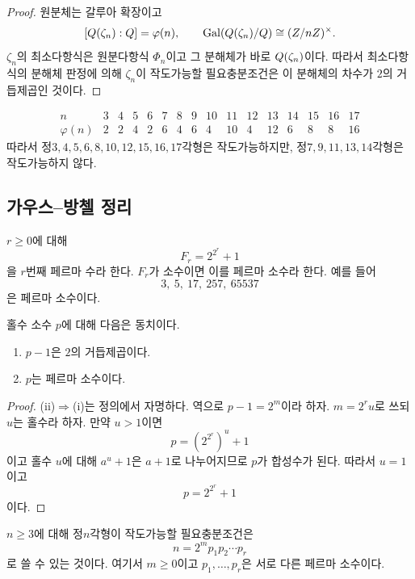 \begin{proof}
원분체는 갈루아 확장이고
\[
  [Q(\zeta_n):Q]=\varphi(n),
  \qquad
  \operatorname{Gal}(Q(\zeta_n)/Q)\cong(Z/nZ)^\times.
\]
$\zeta_n$의 최소다항식은 원분다항식 $\Phi_n$이고 그 분해체가 바로 $Q(\zeta_n)$이다. 따라서 최소다항식의 분해체 판정에 의해 $\zeta_n$이 작도가능할 필요충분조건은 이 분해체의 차수가 $2$의 거듭제곱인 것이다.
\end{proof}

\begin{example}
\[
\begin{array}{c|rrrrrrrrrrrrrrr}
 n&3&4&5&6&7&8&9&10&11&12&13&14&15&16&17\\
\hline
 \varphi(n)&2&2&4&2&6&4&6&4&10&4&12&6&8&8&16
\end{array}
\]
따라서 정$3,4,5,6,8,10,12,15,16,17$각형은 작도가능하지만, 정$7,9,11,13,14$각형은 작도가능하지 않다.
\end{example}

\subsection{가우스--방첼 정리}

\begin{definition}
$r\ge0$에 대해
\[
  F_r=2^{2^r}+1
\]
을 $r$번째 페르마 수라 한다. $F_r$가 소수이면 이를 페르마 소수라 한다. 예를 들어
\[
  3,\ 5,\ 17,\ 257,\ 65537
\]
은 페르마 소수이다.
\end{definition}

\begin{lemma}
홀수 소수 $p$에 대해 다음은 동치이다.
\begin{enumerate}[label=(\roman*)]
  \item $p-1$은 $2$의 거듭제곱이다.
  \item $p$는 페르마 소수이다.
\end{enumerate}
\end{lemma}

\begin{proof}
(ii)$\Rightarrow$(i)는 정의에서 자명하다. 역으로 $p-1=2^m$이라 하자. $m=2^r u$로 쓰되 $u$는 홀수라 하자. 만약 $u>1$이면
\[
  p=(2^{2^r})^u+1
\]
이고 홀수 $u$에 대해 $a^u+1$은 $a+1$로 나누어지므로 $p$가 합성수가 된다. 따라서 $u=1$이고
\[
  p=2^{2^r}+1
\]
이다.
\end{proof}

\begin{theorem}[가우스--방첼 정리]
\label{thm:gauss-wantzel}
$n\ge3$에 대해 정$n$각형이 작도가능할 필요충분조건은
\[
  n=2^m p_1p_2\cdots p_r
\]
로 쓸 수 있는 것이다. 여기서 $m\ge0$이고 $p_1,\dots,p_r$은 서로 다른 페르마 소수이다.
\end{theorem}

